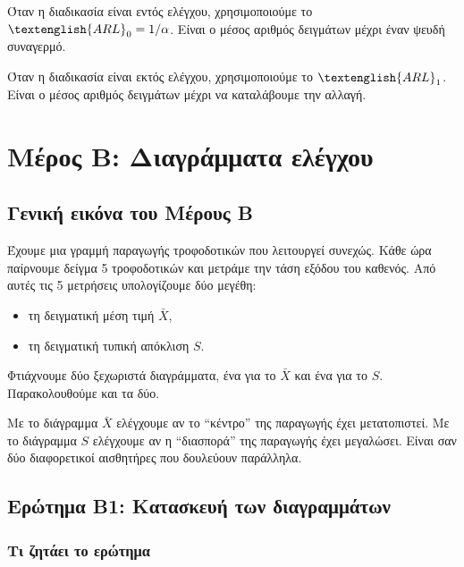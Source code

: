 \documentclass[12pt,a4paper]{article}
\newcommand{\ARL}{\textenglish{ARL}}
\begin{document}
Όταν η διαδικασία είναι εντός ελέγχου, χρησιμοποιούμε το \(\ARL_0=1/\alpha\).
Είναι ο μέσος αριθμός δειγμάτων μέχρι έναν ψευδή συναγερμό.

Όταν η διαδικασία είναι εκτός ελέγχου, χρησιμοποιούμε το \(\ARL_1\). Είναι ο
μέσος αριθμός δειγμάτων μέχρι να καταλάβουμε την αλλαγή.

\newpage

\section{Μέρος Β: Διαγράμματα ελέγχου}

\subsection{Γενική εικόνα του Μέρους Β}

Έχουμε μια γραμμή παραγωγής τροφοδοτικών που λειτουργεί συνεχώς. Κάθε ώρα
παίρνουμε δείγμα 5 τροφοδοτικών και μετράμε την τάση εξόδου του καθενός.
Από αυτές τις 5 μετρήσεις υπολογίζουμε δύο μεγέθη:

\begin{itemize}[leftmargin=2.2em]
    \item τη δειγματική μέση τιμή \(\bar X\),
    \item τη δειγματική τυπική απόκλιση \(S\).
\end{itemize}

Φτιάχνουμε δύο ξεχωριστά διαγράμματα, ένα για το \(\bar X\) και ένα για το
\(S\). Παρακολουθούμε και τα δύο.

\begin{intuition}
Με το διάγραμμα \(\bar X\) ελέγχουμε αν το ``κέντρο'' της παραγωγής έχει
μετατοπιστεί. Με το διάγραμμα \(S\) ελέγχουμε αν η ``διασπορά'' της
παραγωγής έχει μεγαλώσει. Είναι σαν δύο διαφορετικοί αισθητήρες που
δουλεύουν παράλληλα.
\end{intuition}

\subsection{Ερώτημα Β1: Κατασκευή των διαγραμμάτων}

\subsubsection*{Τι ζητάει το ερώτημα}
\end{document}
